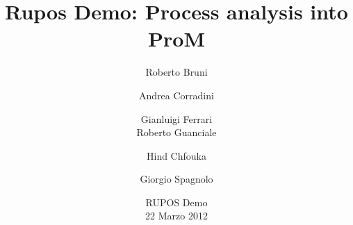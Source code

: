 \documentclass[10pt]{beamer}
\title{Rupos Demo: Process analysis into ProM}
\author[Bruni, Corradini, Ferrari, Guanciale, Chfouka, \alert{Spagnolo}]{Roberto Bruni \and Andrea Corradini  \and Gianluigi Ferrari\\ 
	Roberto Guanciale \and Hind Chfouka  \and \alert{Giorgio Spagnolo}}
\institute{Dipartimento di Informatica, Pisa}
\date{RUPOS Demo \\ 22 Marzo 2012}
\begin{document}
	\frame{\titlepage}
	
	
	
	
	
	
	
\end{document}
